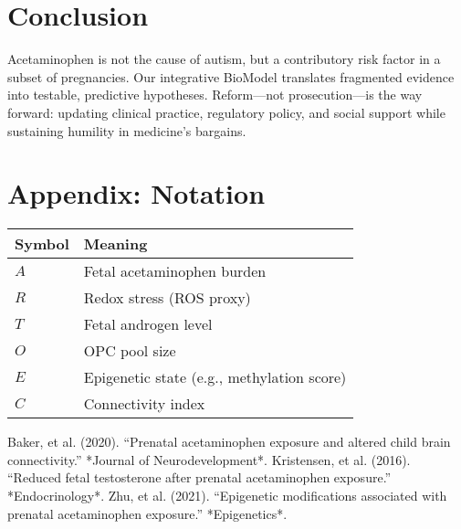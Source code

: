 \documentclass[12pt]{article}
\begin{document}
\section{Conclusion}
Acetaminophen is not the cause of autism, but a contributory risk factor in a subset of pregnancies. Our integrative BioModel translates fragmented evidence into testable, predictive hypotheses. Reform---not prosecution---is the way forward: updating clinical practice, regulatory policy, and social support while sustaining humility in medicine’s bargains.

\section*{Appendix: Notation}
\begin{table}[h]
\centering
\begin{tabular}{@{}ll@{}}
\toprule
Symbol & Meaning \\
\midrule
$A$ & Fetal acetaminophen burden \\
$R$ & Redox stress (ROS proxy) \\
$T$ & Fetal androgen level \\
$O$ & OPC pool size \\
$E$ & Epigenetic state (e.g., methylation score) \\
$C$ & Connectivity index \\
\bottomrule
\end{tabular}
\end{table}



\begin{thebibliography}{9}
 Baker, et al. (2020). ``Prenatal acetaminophen exposure and altered child brain connectivity.'' *Journal of Neurodevelopment*.
 Kristensen, et al. (2016). ``Reduced fetal testosterone after prenatal acetaminophen exposure.'' *Endocrinology*.
 Zhu, et al. (2021). ``Epigenetic modifications associated with prenatal acetaminophen exposure.'' *Epigenetics*.
\end{thebibliography}
\end{document}
